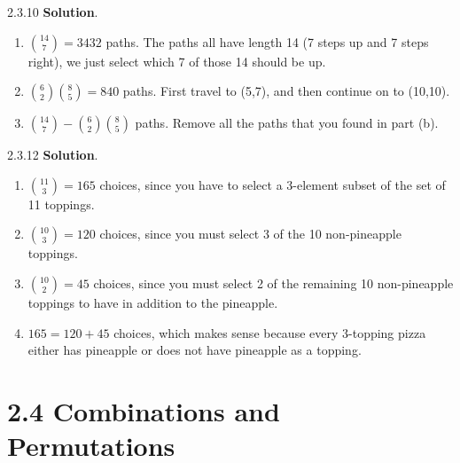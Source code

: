\documentclass[11pt,]{book}
\theoremstyle{ptxplainnotitle}
\theoremstyle{ptxplaintitle}
\theoremstyle{ptxdefinitionnotitle}
\theoremstyle{ptxdefinitiontitle}
\theoremstyle{ptxdefinitionnotitle}
\theoremstyle{ptxdefinitiontitle}
\theoremstyle{ptxdefinitionnotitle}
\theoremstyle{ptxdefinitiontitle}
\theoremstyle{ptxdefinitiontitlenonumber}
\theoremstyle{ptxdefinitiontitlenonumber}
\numberwithin{equation}{chapter}
\begin{document}
\begin{divisionexercise}{2.3.10}
\textbf{Solution}.\quad%
\hypertarget{p-1377}{}%
\leavevmode%
\begin{enumerate}[label=\alph*.]
\item\hypertarget{li-600}{}\hypertarget{p-1378}{}%
\({14 \choose 7} = 3432\) paths.  The paths all have length 14 (7 steps up and 7 steps right), we just select which 7 of those 14 should be up.%
\item\hypertarget{li-601}{}\hypertarget{p-1379}{}%
\({6 \choose 2}{8\choose 5} = 840\) paths.  First travel to (5,7), and then continue on to (10,10).%
\item\hypertarget{li-602}{}\hypertarget{p-1380}{}%
\({14 \choose 7} - {6\choose 2}{8 \choose 5}\) paths.  Remove all the paths that you found in part (b).%
\end{enumerate}
%
\end{divisionexercise}%
\begin{divisionexercise}{2.3.12}
\textbf{Solution}.\quad%
\hypertarget{p-1403}{}%
\leavevmode%
\begin{enumerate}[label=\alph*.]
\item\hypertarget{li-615}{}\hypertarget{p-1404}{}%
\({11 \choose 3} = 165\) choices, since you have to select a 3-element subset of the set of 11 toppings.%
\item\hypertarget{li-616}{}\hypertarget{p-1405}{}%
\({10 \choose 3} = 120\) choices, since you must select 3 of the 10 non-pineapple toppings.%
\item\hypertarget{li-617}{}\hypertarget{p-1406}{}%
\({10 \choose 2} = 45\) choices, since you must select 2 of the remaining 10 non-pineapple toppings to have in addition to the pineapple.%
\item\hypertarget{li-618}{}\hypertarget{p-1407}{}%
\(165  = 120 + 45\) choices, which makes sense because every 3-topping pizza either has pineapple or does not have pineapple as a topping.%
\end{enumerate}
%
\end{divisionexercise}%
\section*{2.4 Combinations and Permutations}
\end{document}
